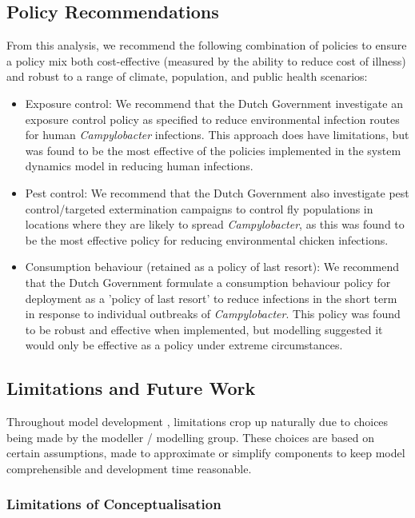 \subsection{Policy Recommendations}
From this analysis, we recommend the following combination of policies to ensure a policy mix both cost-effective (measured by the ability to reduce cost of illness) and robust to a range of climate, population, and public health scenarios:
\begin{itemize}
    \item Exposure control: We recommend that the Dutch Government investigate an exposure control policy as specified to reduce environmental infection routes for human \textit{Campylobacter} infections. This approach does have limitations, but was found to be the most effective of the policies implemented in the system dynamics model in reducing human infections.
    \item Pest control: We recommend that the Dutch Government also investigate pest control/targeted extermination campaigns to control fly populations in locations where they are likely to spread \textit{Campylobacter}, as this was found to be the most effective policy for reducing environmental chicken infections.
    \item Consumption behaviour (retained as a policy of last resort): We recommend that the Dutch Government formulate a consumption behaviour policy for deployment as a 'policy of last resort' to reduce infections in the short term in response to individual outbreaks of \textit{Campylobacter}. This policy was found to be robust and effective when implemented, but modelling suggested it would only be effective as a policy under extreme circumstances.
\end{itemize}

\subsection{Limitations and Future Work}

Throughout model development , limitations crop up naturally due to choices being made by the modeller / modelling group. These choices are based on certain assumptions, made to approximate or simplify components to keep model comprehensible and development time reasonable.

\subsubsection{Limitations of Conceptualisation}

